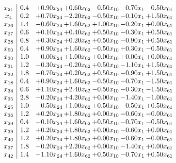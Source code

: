 \documentclass[8pt]{article}
\begin{document}
\[\begin{array}{c| c c@{\hskip 2pt} c@{\hskip 2pt} c@{\hskip 2pt} c@{\hskip 2pt} c@{\hskip 2pt} }
 x_{21}   &  0.4 & +  0.90 x_{24} & +  0.60 x_{62} & -0.50 x_{10} & -0.70 x_{1} & -0.50 x_{61}\\
 x_{4}   &  0.2 & +  0.70 x_{24} & -2.20 x_{62} & -0.50 x_{10} & -0.10 x_{1} & +  1.50 x_{61}\\
 x_{26}   &  1.4 & -0.60 x_{24} & +  1.60 x_{62} & +  1.00 x_{10} & -0.20 x_{1} & +  0.00 x_{61}\\
 x_{27}   &  0.6 & +  0.10 x_{24} & +  0.40 x_{62} & +  0.50 x_{10} & -0.30 x_{1} & +  0.50 x_{61}\\
 x_{28}   &  0.8 & +  0.30 x_{24} & +  0.20 x_{62} & +  0.50 x_{10} & -0.90 x_{1} & +  0.50 x_{61}\\
 x_{50}   &  0.4 & +  0.90 x_{24} & +  1.60 x_{62} & -0.50 x_{10} & +  0.30 x_{1} & -0.50 x_{61}\\
 x_{30}   &  1.0 & -0.00 x_{24} & +  1.00 x_{62} & +  0.00 x_{10} & +  0.00 x_{1} & +  0.00 x_{61}\\
 x_{31}   &  1.2 & -0.30 x_{24} & -0.20 x_{62} & +  0.50 x_{10} & -1.10 x_{1} & +  1.50 x_{61}\\
 x_{32}   &  1.8 & -0.70 x_{24} & +  0.20 x_{62} & +  0.50 x_{10} & -0.90 x_{1} & +  1.50 x_{61}\\
 x_{18}   &  0.4 & +  0.90 x_{24} & +  1.60 x_{62} & -0.50 x_{10} & -0.70 x_{1} & -1.50 x_{61}\\
 x_{34}   &  0.6 & +  1.10 x_{24} & +  2.40 x_{62} & -0.50 x_{10} & -0.30 x_{1} & -1.50 x_{61}\\
 x_{35}   &  2.8 & -0.20 x_{24} & +  4.20 x_{62} & +  0.00 x_{10} & -1.40 x_{1} & -1.00 x_{61}\\
 x_{25}   &  1.0 & -0.50 x_{24} & +  1.00 x_{62} & +  0.50 x_{10} & -0.50 x_{1} & +  0.50 x_{61}\\
 x_{36}   &  1.2 & +  0.20 x_{24} & +  1.80 x_{62} & +  0.00 x_{10} & -0.60 x_{1} & -0.00 x_{61}\\
 x_{29}   &  0.4 & -0.10 x_{24} & +  1.60 x_{62} & +  0.50 x_{10} & -0.70 x_{1} & -0.50 x_{61}\\
 x_{39}   &  1.2 & +  0.20 x_{24} & +  1.80 x_{62} & +  0.00 x_{10} & -0.60 x_{1} & +  0.00 x_{61}\\
 x_{40}   &  1.2 & +  0.20 x_{24} & +  1.80 x_{62} & +  0.00 x_{10} & -0.60 x_{1} & -0.00 x_{61}\\
 x_{37}   &  1.8 & -0.20 x_{24} & +  2.20 x_{62} & +  0.00 x_{10} & -1.40 x_{1} & +  0.00 x_{61}\\
 x_{42}   &  1.4 & -1.10 x_{24} & +  1.60 x_{62} & +  0.50 x_{10} & -0.70 x_{1} & +  0.50 x_{61}\\

\end{array}\]
\end{document}
